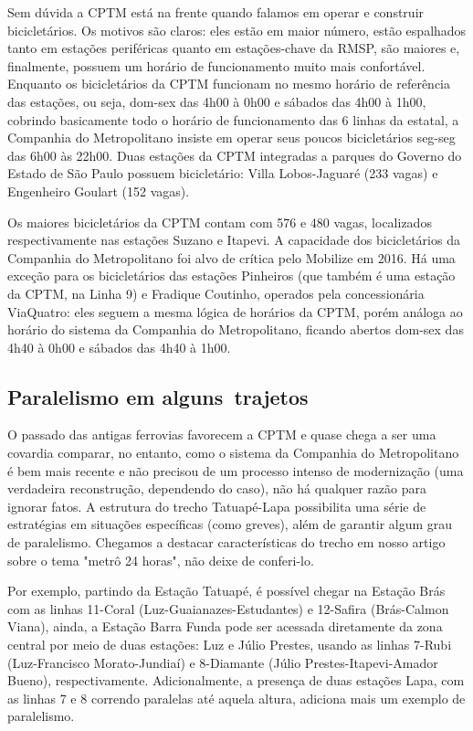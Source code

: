 \documentclass[11pt,fleqn]{book} %
\begin{document}
Sem dúvida a CPTM está na frente quando falamos em operar e construir bicicletários. Os motivos são claros: eles estão em maior número, estão espalhados tanto em estações periféricas quanto em estações-chave da RMSP, são maiores e, finalmente, possuem um horário de funcionamento muito mais confortável. Enquanto os bicicletários da CPTM funcionam no mesmo horário de referência das estações, ou seja, dom-sex das 4h00 à 0h00 e sábados das 4h00 à 1h00, cobrindo basicamente todo o horário de funcionamento das 6 linhas da estatal, a Companhia do Metropolitano insiste em operar seus poucos bicicletários seg-seg das 6h00 às 22h00. Duas estações da CPTM integradas a parques do Governo do Estado de São Paulo possuem bicicletário: Villa Lobos-Jaguaré (233 vagas) e Engenheiro Goulart (152 vagas).

Os maiores bicicletários da CPTM contam com 576 e 480 vagas, localizados respectivamente nas estações Suzano e Itapevi. A capacidade dos bicicletários da Companhia do Metropolitano foi alvo de crítica pelo Mobilize em 2016. Há uma exceção para os bicicletários das estações Pinheiros (que também é uma estação da CPTM, na Linha 9) e Fradique Coutinho, operados pela concessionária ViaQuatro: eles seguem a mesma lógica de horários da CPTM, porém análoga ao horário do sistema da Companhia do Metropolitano, ficando abertos dom-sex das 4h40 à 0h00 e sábados das 4h40 à 1h00.

\subsection{Paralelismo em alguns trajetos}

O passado das antigas ferrovias favorecem a CPTM e quase chega a ser uma covardia comparar, no entanto, como o sistema da Companhia do Metropolitano é bem mais recente e não precisou de um processo intenso de modernização (uma verdadeira reconstrução, dependendo do caso), não há qualquer razão para ignorar fatos. A estrutura do trecho Tatuapé-Lapa possibilita uma série de estratégias em situações específicas (como greves), além de garantir algum grau de paralelismo. Chegamos a destacar características do trecho em nosso artigo sobre o tema "metrô 24 horas", não deixe de conferi-lo.

Por exemplo, partindo da Estação Tatuapé, é possível chegar na Estação Brás com as linhas 11-Coral (Luz-Guaianazes-Estudantes) e 12-Safira (Brás-Calmon Viana), ainda, a Estação Barra Funda pode ser acessada diretamente da zona central por meio de duas estações: Luz e Júlio Prestes, usando as linhas 7-Rubi (Luz-Francisco Morato-Jundiaí) e 8-Diamante (Júlio Prestes-Itapevi-Amador Bueno), respectivamente. Adicionalmente, a presença de duas estações Lapa, com as linhas 7 e 8 correndo paralelas até aquela altura, adiciona mais um exemplo de paralelismo.
\end{document}

